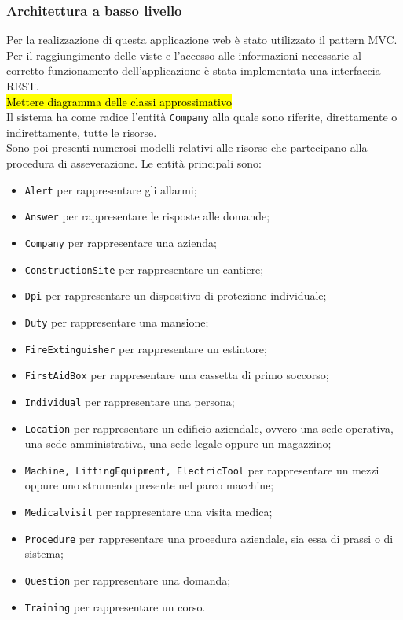 \subsubsection{Architettura a basso livello}

Per la realizzazione di questa applicazione web è stato utilizzato il pattern \gls{MVC}. Per il raggiungimento delle viste e l'accesso alle informazioni necessarie al corretto funzionamento dell'applicazione è stata implementata una interfaccia \gls{REST}. \\
\hl{Mettere diagramma delle classi approssimativo}\\
Il sistema ha come radice l'entità \texttt{Company} alla quale sono riferite, direttamente o indirettamente, tutte le risorse.\\ Sono poi presenti numerosi modelli relativi alle risorse che partecipano alla procedura di asseverazione. Le entità principali sono:
\begin{itemize} 
	
	\item \texttt{Alert} per rappresentare gli allarmi;
	\item \texttt{Answer} per rappresentare le risposte alle domande;
	\item \texttt{Company} per rappresentare una azienda;
	\item \texttt{ConstructionSite} per rappresentare un cantiere;
	\item \texttt{Dpi} per rappresentare un dispositivo di protezione individuale;
	\item \texttt{Duty} per rappresentare una mansione;
	\item \texttt{FireExtinguisher}  per rappresentare un estintore;
	\item \texttt{FirstAidBox} per rappresentare una cassetta di primo soccorso;
	\item \texttt{Individual} per rappresentare una persona;
	\item \texttt{Location} per rappresentare un edificio aziendale, ovvero una sede operativa, una sede amministrativa, una sede legale oppure un magazzino;
	\item \texttt{Machine, LiftingEquipment, ElectricTool}  per rappresentare un mezzi oppure uno strumento presente nel parco macchine;
	\item \texttt{Medicalvisit} per rappresentare una visita medica;
	\item \texttt{Procedure} per rappresentare una procedura aziendale, sia essa di prassi o di sistema;
	\item \texttt{Question} per rappresentare una domanda;
	\item \texttt{Training} per rappresentare un corso.
\end{itemize}	
